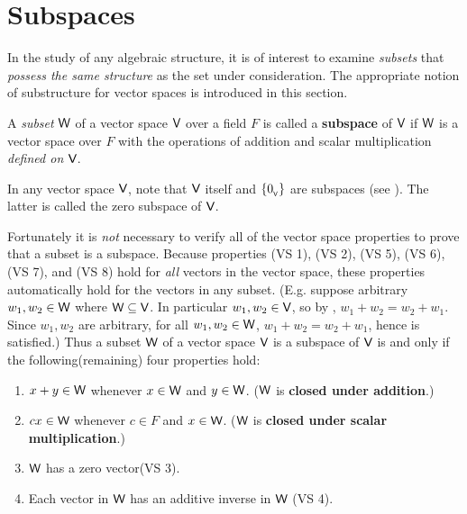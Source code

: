 \section{Subspaces} \label{sec 1.3}

In the study of any algebraic structure, it is of interest to examine \emph{subsets} that \emph{possess the same structure} as the set under consideration.
The appropriate notion of substructure for vector spaces is introduced in this section.

\begin{definition} \label{def 1.2}
A \emph{subset} \(\textsf{W}\) of a vector space \(\textsf{V}\) over a field \(F\) is called a \textbf{subspace} of \(\textsf{V}\) if \(\textsf{W}\) is a vector space over \(F\) with the operations of addition and scalar multiplication \emph{defined on} \(\textsf{V}\).
\end{definition}

\begin{note}
In any vector space \(\textsf{V}\), note that \(\textsf{V}\) itself and \(\{ 0_{_{\textsf{V}}} \}\) are subspaces (see ).
The latter is called the zero subspace of \(\textsf{V}\).
\end{note}

Fortunately it is \emph{not} necessary to verify all of the vector space properties to prove that a subset is a subspace.
Because properties  (VS 1), (VS 2), (VS 5), (VS 6), (VS 7), and (VS 8) hold for \emph{all} vectors in the vector space, these properties automatically hold for the vectors in any subset.
(E.g. suppose arbitrary \(w_1, w_2 \in \textsf{W}\) where \(\textsf{W} \subseteq \textsf{V}\).
In particular \(w_1, w_2 \in \textsf{V}\), so by , \(w_1 + w_2 = w_2 + w_1\).
Since \(w_1, w_2\) are arbitrary, for all \(w_1, w_2 \in \textsf{W}\), \(w_1 + w_2 = w_2 + w_1\), hence  is satisfied.)
Thus a subset \(\textsf{W}\) of a vector space \(\textsf{V}\) is a subspace of \(\textsf{V}\) is and only if the following(remaining) four properties hold:
\begin{enumerate} \label{discussion of thm 1.3}
    \item \(x + y \in \textsf{W}\) whenever \(x \in \textsf{W}\) and \(y \in \textsf{W}\). (\(\textsf{W}\) is \textbf{closed under addition}.)
    \item \(cx \in \textsf{W}\) whenever \(c \in F\) and \(x \in \textsf{W}\). (\(\textsf{W}\) is \textbf{closed under scalar multiplication}.)
    \item \(\textsf{W}\) has a zero vector(VS 3).
    \item Each vector in \(\textsf{W}\) has an additive inverse in \(\textsf{W}\) (VS 4).
\end{enumerate}

